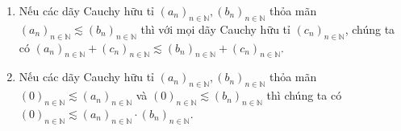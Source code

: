 \begin{appendixthm}\label{appendixthm:addition-multiplication-and-preorder-of-cauchy-sequences}
    \begin{enumerate}[label={(\roman*)}]
        \item Nếu các dãy Cauchy hữu tỉ ${(a_{n})}_{n\in\mathbb{N}}, {(b_{n})}_{n\in\mathbb{N}}$ thỏa mãn ${(a_{n})}_{n\in\mathbb{N}}\lesssim {(b_{n})}_{n\in\mathbb{N}}$ thì với mọi dãy Cauchy hữu tỉ ${(c_{n})}_{n\in\mathbb{N}}$, chúng ta có ${(a_{n})}_{n\in\mathbb{N}} + {(c_{n})}_{n\in\mathbb{N}}\lesssim {(b_{n})}_{n\in\mathbb{N}} + {(c_{n})}_{n\in\mathbb{N}}$.
        \item  Nếu các dãy Cauchy hữu tỉ ${(a_{n})}_{n\in\mathbb{N}}, {(b_{n})}_{n\in\mathbb{N}}$ thỏa mãn ${(0)}_{n\in\mathbb{N}}\lesssim {(a_{n})}_{n\in\mathbb{N}}$ và ${(0)}_{n\in\mathbb{N}}\lesssim {(b_{n})}_{n\in\mathbb{N}}$ thì chúng ta có ${(0)}_{n\in\mathbb{N}}\lesssim {(a_{n})}_{n\in\mathbb{N}}\cdot {(b_{n})}_{n\in\mathbb{N}}$.
    \end{enumerate}
\end{appendixthm}

